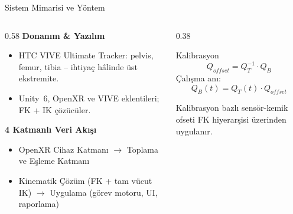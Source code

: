 \documentclass[aspectratio=169,12pt]{beamer}
\begin{document}
\begin{frame}{Sistem Mimarisi ve Y\"{o}ntem}
  \begin{columns}[T]
    \begin{column}{0.58\textwidth}
      \textcolor{pvred}{\textbf{Donan\i{}m \& Yaz\i{}l\i{}m}}
      \begin{itemize}\setlength\itemsep{0.25em}
        \item HTC VIVE Ultimate Tracker: pelvis, femur, tibia --
              ihtiya\c{c} h\^{a}linde \"{u}st ekstremite.
        \item Unity~6, OpenXR ve VIVE eklentileri; FK + IK \c{c}\"{o}z\"{u}c\"{u}ler.
      \end{itemize}

      \vspace{0.5em}
      \textcolor{pvred}{\textbf{4 Katmanl\i{} Veri Ak\i{}\c{s}\i{}}}
      \begin{itemize}\setlength\itemsep{0.25em}
        \item OpenXR Cihaz Katman\i{} $\rightarrow$ Toplama ve E\c{s}leme Katman\i{}
        \item Kinematik \c{C}\"{o}z\"{u}m (FK + tam v\"{u}cut IK) $\rightarrow$
              Uygulama (g\"{o}rev motoru, UI, raporlama)
      \end{itemize}
    \end{column}

    \begin{column}{0.38\textwidth}
      \begin{block}{Kalibrasyon}
        \[Q_{offset} = Q_T^{-1} \cdot Q_B\]
        \vspace{-0.4em}
        \c{C}al\i{}\c{s}ma an\i{}:
        \[Q_B(t) = Q_T(t) \cdot Q_{offset}\]
      \end{block}
      \vspace{0.35em}
      \small Kalibrasyon bazl\i{} sens\"{o}r-kemik ofseti FK hiyerar\c{s}isi
      \"{u}zerinden uygulan\i{}r.
    \end{column}
  \end{columns}
\end{frame}
\end{document}

